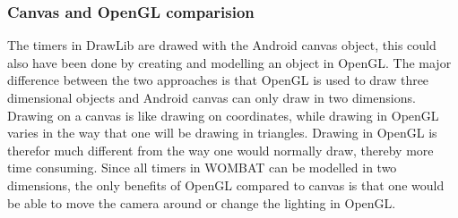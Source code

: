 \subsubsection*{Canvas and OpenGL comparision}
\label{subsection:compare}
The timers in DrawLib are drawed with the Android canvas object, this could also have been done by creating and modelling an object in OpenGL.
The major difference between the two approaches is that OpenGL is used to draw three dimensional objects and Android canvas can only draw in two dimensions.
Drawing on a canvas is like drawing on coordinates, while drawing in OpenGL varies in the way that one will be drawing in triangles.
Drawing in OpenGL is therefor much different from the way one would normally draw, thereby more time consuming.
Since all timers in WOMBAT can be modelled in two dimensions, the only benefits of OpenGL compared to canvas is that one would be able to move the camera around or change the lighting in OpenGL.\\
\\

